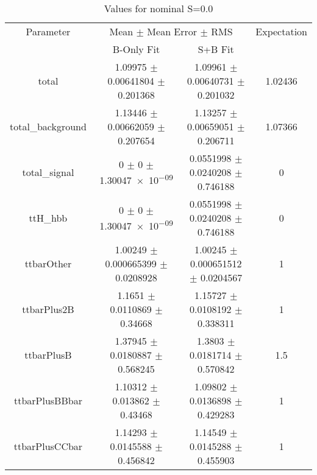 \begin{table}
\centering
\caption{Values for nominal S=0.0}
\begin{tabular}{cccc}
\toprule
Parameter & \multicolumn{2}{c}{Mean $\pm$ Mean Error $\pm$ RMS} & Expectation\\
 & B-Only Fit & S+B Fit & \\
\midrule
total & \num{1.09975} $\pm$ \num{0.00641804} $\pm$ \num{0.201368} & \num{1.09961} $\pm$ \num{0.00640731} $\pm$ \num{0.201032} & \num{1.02436}\\
total\_background & \num{1.13446} $\pm$ \num{0.00662059} $\pm$ \num{0.207654} & \num{1.13257} $\pm$ \num{0.00659051} $\pm$ \num{0.206711} & \num{1.07366}\\
total\_signal & \num{0} $\pm$ \num{0} $\pm$ \num{1.30047e-09} & \num{0.0551998} $\pm$ \num{0.0240208} $\pm$ \num{0.746188} & \num{0}\\
ttH\_hbb & \num{0} $\pm$ \num{0} $\pm$ \num{1.30047e-09} & \num{0.0551998} $\pm$ \num{0.0240208} $\pm$ \num{0.746188} & \num{0}\\
ttbarOther & \num{1.00249} $\pm$ \num{0.000665399} $\pm$ \num{0.0208928} & \num{1.00245} $\pm$ \num{0.000651512} $\pm$ \num{0.0204567} & \num{1}\\
ttbarPlus2B & \num{1.1651} $\pm$ \num{0.0110869} $\pm$ \num{0.34668} & \num{1.15727} $\pm$ \num{0.0108192} $\pm$ \num{0.338311} & \num{1}\\
ttbarPlusB & \num{1.37945} $\pm$ \num{0.0180887} $\pm$ \num{0.568245} & \num{1.3803} $\pm$ \num{0.0181714} $\pm$ \num{0.570842} & \num{1.5}\\
ttbarPlusBBbar & \num{1.10312} $\pm$ \num{0.013862} $\pm$ \num{0.43468} & \num{1.09802} $\pm$ \num{0.0136898} $\pm$ \num{0.429283} & \num{1}\\
ttbarPlusCCbar & \num{1.14293} $\pm$ \num{0.0145588} $\pm$ \num{0.456842} & \num{1.14549} $\pm$ \num{0.0145288} $\pm$ \num{0.455903} & \num{1}\\
\bottomrule
\end{tabular}
\end{table}